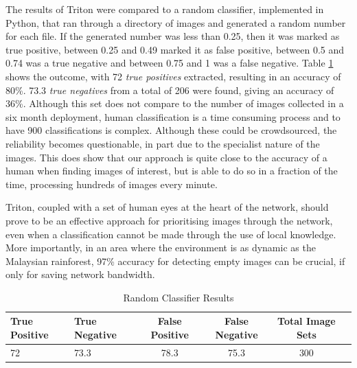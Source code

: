 		The results of Triton were compared to a random classifier, implemented in Python, that ran through a directory of images and generated a random number for each file. If the generated number was less than 0.25, then it was marked as true positive, between 0.25 and 0.49 marked it as false positive, between 0.5 and 0.74 was a true negative and between 0.75 and 1 was a false negative. Table \ref{table:random} shows the outcome, with 72 \textit{true positives} extracted, resulting in an accuracy of 80\%. 73.3 \textit{true negatives} from a total of 206 were found, giving an accuracy of 36\%. Although this set does not compare to the number of images collected in a six month deployment, human classification is a time consuming process and to have 900 classifications is complex. Although these could be crowdsourced, the reliability becomes questionable, in part due to the specialist nature of the images. This does show that our approach is quite close to the accuracy of a human when finding images of interest, but is able to do so in a fraction of the time, processing hundreds of images every minute. 
		
		Triton, coupled with a set of human eyes at the heart of the network, should prove to be an effective approach for prioritising images through the network, even when a classification cannot be made through the use of local knowledge. More importantly, in an area where the environment is as dynamic as the Malaysian rainforest, 97\% accuracy for detecting empty images can be crucial, if only for saving network bandwidth.
		
		\begin{footnotesize}
		\begin{table}
		\centering
			\hfill{}
			\begin{tabular}{|l|l|c|c|c|c|}
				\hline
					True Positive & True Negative & False Positive  & False Negative & Total Image Sets \\
				\hline
					72 & 73.3 & 78.3 & 75.3 & 300 \\
				\hline
			\end{tabular}
			\hfill{}
			\caption{Random Classifier Results}
			\label{table:random}
		\end{table}		
		\end{footnotesize}	
%	

